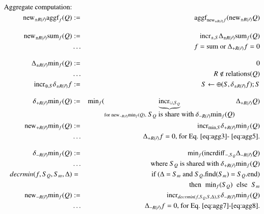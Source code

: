 \documentclass{article}
\begin{document}
%
%
%
\begin{figure*}
\begin{eqnarray}
\mbox{Aggregate computation:} && \nonumber
\\
\label{eq:agg1}
\algnew_{\pm R(\vec{r})} \algaggf_f(Q) &:=&
   \algaggf_{\algnew_{\pm R(\vec{r})} f}(\algnew_{\pm R(\vec{r})} Q)
%
%
\\[2ex]
\label{eq:agg2}
\algnew_{\pm R(\vec{r})} \algsum_{f}(Q) &:=&
\algincr_{\pm, S} \Delta_{\pm R(\vec{r})} \algsum_{f}(Q)
\\
\nonumber &\dots&
\mbox{$f = \algsum$ or $\Delta_{+R(\vec{r})} f = 0$}
%
%
\\[2ex]
\label{eq:agg3}
\Delta_{\pm R(\vec{r})} \algmin_f(Q) &:=& 0
\\
\nonumber &\dots& R \notin \mbox{relations($Q$)}
%
%
\\
\label{eq:agg4}
\algincr_{\oplus, S} \delta_{\pm R(\vec{r})} f &:=&
S \leftarrow \oplus(S, \delta_{\pm R(\vec{r})} f); S
%
%
\\[2ex]
\label{eq:agg5}
\delta_{+R(\vec{r})} \algmin_f(Q) &:=&
    \algmin_{f} (\underbrace{\algincr_{\cup, S_Q}}_{
    \mathrm{for} \; \algnew_{-R(\vec{r})} \algmin_f(Q), \mbox{ $S_Q$ is share with $\delta_{-R(\vec{r})} \algmin_f(Q)$}}
    \Delta_{+R(\vec{r})} Q)
\\
\label{eq:agg6}
\algnew_{+R(\vec{r})} \algmin_{f}(Q) &:=&
\algincr_{\min,S} \delta_{+R(\vec{r})} \algmin_{f}(Q)
\\
\nonumber
&\dots& \Delta_{+R(\vec{r})} f = 0
\mbox{, for Eq.~\ref{eq:agg3}-~\ref{eq:agg5}.}
%
%
\\[2ex]
\label{eq:agg7}
\delta_{-R(\vec{r})} \algmin_{f}(Q) &:=& \algmin_{f}(\algincrdiff_{-,S_Q} \Delta_{-R(\vec{r})} Q)
\\
\nonumber &\dots& \mbox{where $S_Q$ is shared with $\delta_{+R(\vec{r})} \algmin_f(Q)$}
\\
\label{eq:agg8}
decrmin(f, S_Q, S_m, \Delta) &=&
\mbox{if ($\Delta$ = $S_m$ and $S_Q$.find($S_m$) = $S_Q$.end)}\\
\nonumber && \mbox{then} \; \; \algmin_{f}(S_Q) \; \; \mbox{else} \; \; S_m
\\
\label{eq:agg9}
\algnew_{-R(\vec{r})} \algmin_{f}(Q) &:=&
\algincr_{decrmin(f, S_Q, S, \Delta), S} \delta_{-R(\vec{r})} \algmin_{f}(Q)
\\
\nonumber &\dots& \Delta_{-R(\vec{r})} f = 0
\mbox{, for Eq.~\ref{eq:agg7}-\ref{eq:agg8}.}
\end{eqnarray}
\end{figure*}
\end{document}
